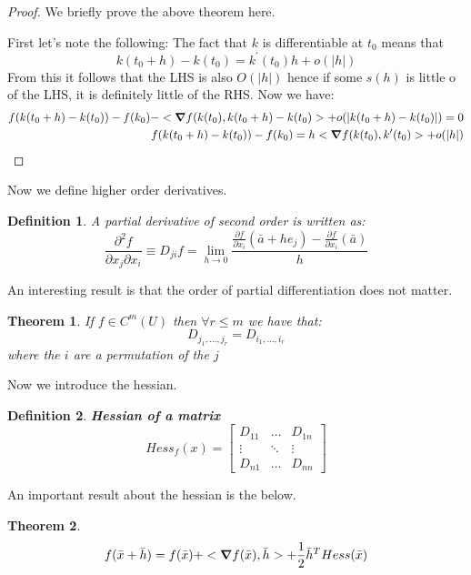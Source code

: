 \documentclass[titlepage]{article}
\newtheorem{theorem}{Theorem}[section]
\newtheorem{definition}{Definition}
\begin{document}
\begin{proof}
We briefly prove the above theorem here.

First let's note the following:
The fact that $k$ is differentiable at $t_{0}$ means that 
$$k(t_{0}+h) - k(t_{0}) = k^{\prime}(t_{0})h + o(|h|) $$ From this it follows that the LHS is also $O(|h|)$ hence if some $s(h)$ is little o of the LHS, it is definitely little of the RHS. Now we have:
\begin{align*}
    f(k(t_{0}+h) - k(t_{0})) - f(k_{0}) - <\grad f(k(t_{0}),k(t_{0}+h) - k(t_{0})> + o(|k(t_{0}+h) - k(t_{0})|) = 0\\
     f(k(t_{0}+h) - k(t_{0})) - f(k_{0}) = h<\grad f(k(t_{0}),k^{\prime}(t_{0})> + o(|h|)
\end{align*}
\end{proof}

Now we define higher order derivatives. 
\begin{definition}
A partial derivative of second order is written as:
$$\frac{\partial^{2}f}{\partial x_{j} \partial x_{i}} \equiv D_{ji}f = \lim_{h\to 0}\frac{\frac{\partial f}{\partial x_{i}}(\bar{a} + he_{j}) - \frac{\partial f}{\partial x_{i}}(\bar{a})}{h} $$
\end{definition}

An interesting result is that the order of partial differentiation does not matter.
\begin{theorem}
If $f \in C^{m}(U)$ then $\forall r \leq m$ we have that:
$$D_{j_{1},\ldots, j_{r}} = D_{i_{1},\ldots, i_{r}} $$ where the $i$ are a permutation of the $j$
\end{theorem}

Now we introduce the hessian. 

\begin{definition}\textbf{Hessian of a matrix}
$$ Hess_{f}(x) = 
\begin{bmatrix}
 D_{11} & \ldots & D_{1n}\\
 \vdots & \ddots & \vdots\\
 D_{n1} & \ldots & D_{nn}
\end{bmatrix}
$$
\end{definition}

An important result about the hessian is the below. 

\begin{theorem}
$$f(\bar{x}+\bar{h}) = f(\bar{x}) + <\grad f(\bar{x}),\bar{h}> + \frac{1}{2} \bar{h}^{T} Hess(\bar{x})$$
\end{theorem}
\end{document}
